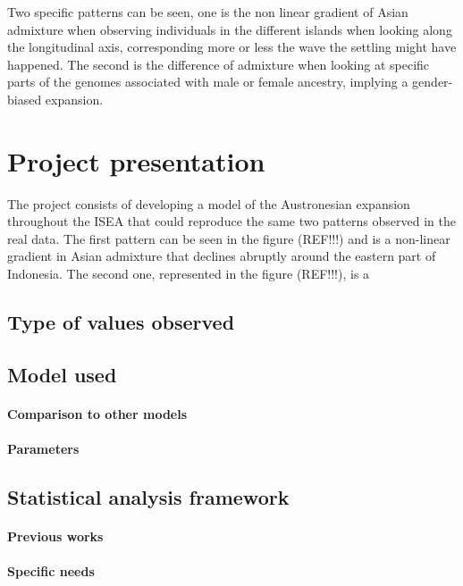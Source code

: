 \documentclass[a4paper,12pt]{report}
\begin{document}
Two specific patterns can be seen, one is the non linear gradient of Asian admixture when observing individuals in the different islands when looking along the longitudinal axis, corresponding more or less the wave the settling might have happened. The second is the difference of admixture when looking at specific parts of the genomes associated with male or female ancestry, implying a gender-biased expansion.


\chapter{Project presentation}
The project consists of developing a model of the Austronesian expansion throughout the ISEA that could reproduce the same two patterns observed in the real data.
The first pattern can be seen in the figure (REF!!!) and is a non-linear gradient in Asian admixture that declines abruptly around the eastern part of Indonesia. The second one, represented in the figure (REF!!!), is a 

\section{Type of values observed}

\section{Model used}
\subsubsection{Comparison to other models}
\subsubsection{Parameters}

\section{Statistical analysis framework}
\subsubsection{Previous works}
\subsubsection{Specific needs}
\end{document}
